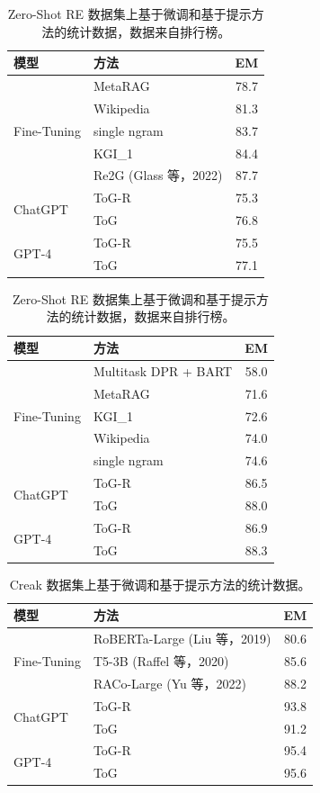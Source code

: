 \documentclass[11pt,UTF8,fontset=fandol]{ctexart}
\begin{document}
\begin{table}[H]\centering
\begin{minipage}[t]{0.49\textwidth}\centering
\caption{T-REx 数据集上基于微调和基于提示方法的统计数据，数据来自排行榜。}
\label{tab:16}
\small
\begin{tabular}{llc}
\toprule
模型 & 方法 & EM \\
\midrule
\multirow{5}{*}{Fine-Tuning} & MetaRAG & 78.7 \\
& Wikipedia & 81.3 \\
& single ngram & 83.7 \\
& KGI\_1 & 84.4 \\
& Re2G (Glass 等，2022) & 87.7 \\
\midrule
\multirow{2}{*}{ChatGPT} & ToG-R & 75.3 \\
& ToG & 76.8 \\
\midrule
\multirow{2}{*}{GPT-4} & ToG-R & 75.5 \\
& ToG & 77.1 \\
\bottomrule
\end{tabular}
\end{minipage}
\hfill
\begin{minipage}[t]{0.49\textwidth}\centering
\caption{Zero-Shot RE 数据集上基于微调和基于提示方法的统计数据，数据来自排行榜。}
\label{tab:17}
\small
\begin{tabular}{llc}
\toprule
模型 & 方法 & EM \\
\midrule
\multirow{5}{*}{Fine-Tuning} & Multitask DPR + BART & 58.0 \\
& MetaRAG & 71.6 \\
& KGI\_1 & 72.6 \\
& Wikipedia & 74.0 \\
& single ngram & 74.6 \\
\midrule
\multirow{2}{*}{ChatGPT} & ToG-R & 86.5 \\
& ToG & 88.0 \\
\midrule
\multirow{2}{*}{GPT-4} & ToG-R & 86.9 \\
& ToG & 88.3 \\
\bottomrule
\end{tabular}
\end{minipage}
\end{table}

\begin{table}[H]\centering
\caption{Creak 数据集上基于微调和基于提示方法的统计数据。}
\label{tab:18}
\small
\begin{tabular}{llc}
\toprule
模型 & 方法 & EM \\
\midrule
\multirow{3}{*}{Fine-Tuning} & RoBERTa-Large (Liu 等，2019) & 80.6 \\
& T5-3B (Raffel 等，2020) & 85.6 \\
& RACo-Large (Yu 等，2022) & 88.2 \\
\midrule
\multirow{2}{*}{ChatGPT} & ToG-R & 93.8 \\
& ToG & 91.2 \\
\midrule
\multirow{2}{*}{GPT-4} & ToG-R & 95.4 \\
& ToG & 95.6 \\
\bottomrule
\end{tabular}
\end{table}
\end{document}
